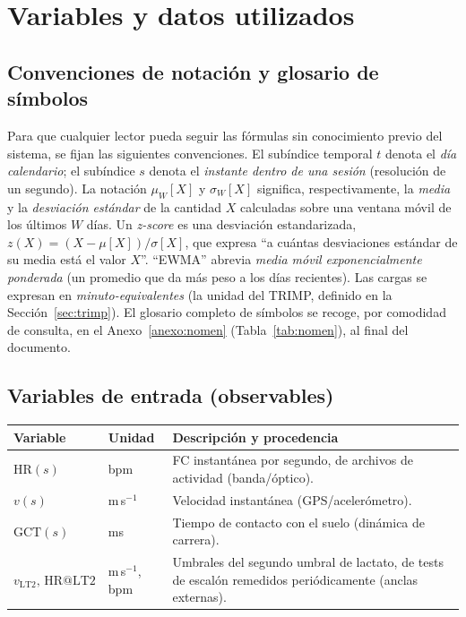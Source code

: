 \documentclass[11pt,a4paper]{article}
\begin{document}
\section{Variables y datos utilizados}

\subsection{Convenciones de notación y glosario de símbolos}
\label{sec:nomen}
Para que cualquier lector pueda seguir las fórmulas sin conocimiento previo del sistema, se fijan las siguientes convenciones. El subíndice temporal $t$ denota el \emph{día calendario}; el subíndice $s$ denota el \emph{instante dentro de una sesión} (resolución de un segundo). La notación $\mu_W[X]$ y $\sigma_W[X]$ significa, respectivamente, la \emph{media} y la \emph{desviación estándar} de la cantidad $X$ calculadas sobre una ventana móvil de los últimos $W$ días. Un \emph{z-score} es una desviación estandarizada, $z(X)=(X-\mu[X])/\sigma[X]$, que expresa ``a cuántas desviaciones estándar de su media está el valor $X$''. ``EWMA'' abrevia \emph{media móvil exponencialmente ponderada} (un promedio que da más peso a los días recientes). Las cargas se expresan en \emph{minuto-equivalentes} (la unidad del TRIMP, definido en la Sección~\ref{sec:trimp}). El glosario completo de símbolos se recoge, por comodidad de consulta, en el Anexo~\ref{anexo:nomen} (Tabla~\ref{tab:nomen}), al final del documento.


\subsection{Variables de entrada (observables)}
\begin{longtable}{@{}p{3.1cm}p{2.0cm}p{9.4cm}@{}}
\toprule
\textbf{Variable} & \textbf{Unidad} & \textbf{Descripción y procedencia} \\
\midrule
\endhead
$\mathrm{HR}(s)$ & bpm & FC instantánea por segundo, de archivos de actividad (banda/óptico). \\
$v(s)$ & m\,s$^{-1}$ & Velocidad instantánea (GPS/acelerómetro). \\
$\mathrm{GCT}(s)$ & ms & Tiempo de contacto con el suelo (dinámica de carrera). \\
$v_{\mathrm{LT2}},\,\mathrm{HR@LT2}$ & m\,s$^{-1}$, bpm & Umbrales del segundo umbral de lactato, de tests de escalón remedidos periódicamente (anclas externas). \\
\bottomrule
\end{longtable}
\end{document}
